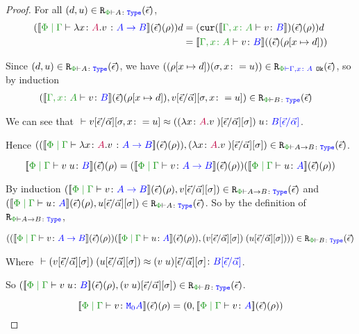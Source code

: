 \begin{proof}
        \case{\vfun}
    
        For all $\inLogRelPE{d}{u}{A}$, 
        \begin{align*}
            (\deno{\gpetyperelation{\lam{x}{A}{v}}{\ab}}\fundRho) d & = (\cur{\deno{\typerelation{\gax}{v}{B}}}\fundRho) d\\
            & = \deno{\typerelation{\gax}{v}{B}} (\fundRhoExt{[x\mapsto d]})\\
        \end{align*}
    
        Since $\inLogRelPE{d}{u}{A}$, we have $\inLogRelPEG{(\rho[x\mapsto d])}{(\si, x\setto u)}{\gax}$, so by induction
        \begin{align*}
            \inLogRelPE{\deno{\typerelation{\gax}{v}{B}}(\ev)(\rho[x\mapsto d])&}{v\ssub{\av}{\ev}\sub{\si, x\setto u}}{B}
        \end{align*}
    
        We can see that $\zberelation{v\ssub{\av}{\ev}{\sub{\si, x\setto u}}}{\apply{((\lam{x}{A}{v})\fundSub)}{u}}{B\ssub{\av}{\ev}}$.
    
        Hence $\inLogRelPE{(\deno{\gpetyperelation{\lam{x}{A}{v}}{\ab}}\fundRho) }{(\lam{x}{A}{v})\fundSub}{\ab}$.
    
    
    \case{\vapply}
    \begin{equation}
        \deno{\gpetyperelation{\apply{v}{u}}{B}}\fundRho = (\deno{\gpetyperelation{v}{\ab}}\fundRho)(\deno{\gpetyperelation{u}{A}}\fundRho)
    \end{equation}
    
    By induction $\inLogRelPE{\deno{\gpetyperelation{v}{\ab}}\fundRho}{v\fundSub}{\ab}$ and $\inLogRelPE{\deno{\gpetyperelation{u}{A}}\fundRho}{u\fundSub}{A}$. So by the definition of $\erelates{\P}{\ab}$, 
    
    \begin{align*}
       \inLogRelPE{(\deno{\gpetyperelation{v}{\ab}}\fundRho)(\deno{\gpetyperelation{u}{A}}\fundRho)}{\apply{(v\fundSub)}{(u\fundSub)})}{B}
    \end{align*}
    
    Where $\zberelation{\apply{(v\fundSub)}{(u\fundSub)}}{(\apply{v}{u})\fundSub}{B\ssub{\av}{\ev}}$.
    
    So $\inLogRelPE{\deno{\gpetyperelation{\apply{v}{u}}{B}}\fundRho}{(\apply{v}{u})\fundSub}{B}$.
    
    
    \case{\vreturn}
    
    \begin{equation}
        \deno{\gpetyperelation{v}{\M{0}{A}}}\fundRho = (0, \deno{\gpetyperelation{v}{A}}\fundRho)
    \end{equation}
    

\end{proof}
